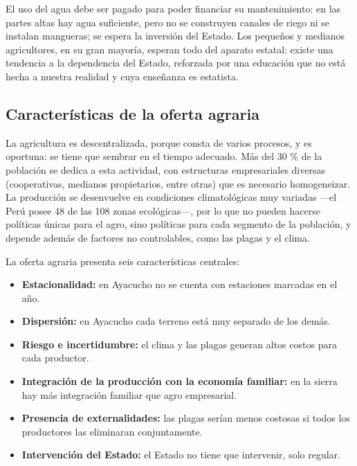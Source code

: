 \documentclass[
  man,
  floatsintext,
  longtable,
  a4paper,
  nolmodern,
  notxfonts,
  notimes,
  12pt,
  colorlinks=true,linkcolor=blue,citecolor=blue,urlcolor=blue]{apa7}
\providecommand{\tightlist}{%
  \setlength{\itemsep}{0pt}\setlength{\parskip}{0pt}}
\begin{document}
El uso del agua debe ser pagado para poder financiar su mantenimiento:
en las partes altas hay agua suficiente, pero no se construyen canales
de riego ni se instalan mangueras; se espera la inversión del Estado.
Los pequeños y medianos agricultores, en su gran mayoría, esperan todo
del aparato estatal: existe una tendencia a la dependencia del Estado,
reforzada por una educación que no está hecha a nuestra realidad y cuya
enseñanza es estatista.

\subsection{Características de la oferta
agraria}\label{caracteruxedsticas-de-la-oferta-agraria}

La agricultura es descentralizada, porque consta de varios procesos, y
es oportuna: se tiene que sembrar en el tiempo adecuado. Más del 30 \%
de la población se dedica a esta actividad, con estructuras
empresariales diversas (cooperativas, medianos propietarios, entre
otras) que es necesario homogeneizar. La producción se desenvuelve en
condiciones climatológicas muy variadas ---el Perú posee 48 de las 108
zonas ecológicas---, por lo que no pueden hacerse políticas únicas para
el agro, sino políticas para cada segmento de la población, y depende
además de factores no controlables, como las plagas y el clima.

La oferta agraria presenta seis características centrales:

\begin{itemize}
\tightlist
\item
  \textbf{Estacionalidad:} en Ayacucho no se cuenta con estaciones
  marcadas en el año.
\item
  \textbf{Dispersión:} en Ayacucho cada terreno está muy separado de los
  demás.
\item
  \textbf{Riesgo e incertidumbre:} el clima y las plagas generan altos
  costos para cada productor.
\item
  \textbf{Integración de la producción con la economía familiar:} en la
  sierra hay más integración familiar que agro empresarial.
\item
  \textbf{Presencia de externalidades:} las plagas serían menos costosas
  si todos los productores las eliminaran conjuntamente.
\item
  \textbf{Intervención del Estado:} el Estado no tiene que intervenir,
  solo regular.
\end{itemize}
\end{document}
